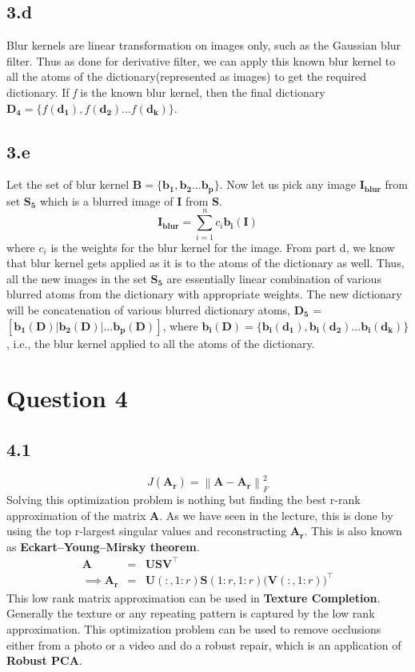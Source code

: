 \documentclass[12pt]{article}
\newcommand{\norm}[1]{\left\lVert #1 \right\rVert}
\begin{document}
\subsection*{3.d}
Blur kernels are linear transformation on images only, such as the Gaussian blur filter. Thus as done for derivative filter, we can apply this known blur kernel to all the atoms of the dictionary(represented as images) to get the required dictionary. If \textit{f} is the known blur kernel, then the final dictionary $\boldsymbol{D_4} = \{f(\boldsymbol{d_1}), f(\boldsymbol{d_2})... f(\boldsymbol{d_k})\}$.
\subsection*{3.e}
Let the set of blur kernel $\boldsymbol{B} = \{\boldsymbol{b_1}, \boldsymbol{b_2}... \boldsymbol{b_p}\}$. Now let us pick any image $\boldsymbol{I_{blur}}$ from set $\boldsymbol{S_5}$ which is a blurred image of $\boldsymbol{I}$ from $\boldsymbol{S}$.
\begin{equation*}
	\boldsymbol{I_{blur}} = \sum_{i=1}^{n}c_i\boldsymbol{b_i(I)}
\end{equation*}
where $c_i$ is the weights for the blur kernel for the image. From part d, we know that blur kernel gets applied as it is to the atoms of the dictionary as well. Thus, all the new images in the set $\boldsymbol{S_5}$ are essentially linear combination of various blurred atoms from the dictionary with appropriate weights. The new dictionary will be concatenation of various blurred dictionary atoms, $\boldsymbol{D_5}$ = $[\boldsymbol{b_1(D)}| \boldsymbol{b_2(D)}|... \boldsymbol{b_p(D)}]$, where $\boldsymbol{b_i(D)} = \{\boldsymbol{b_i(d_1)}, \boldsymbol{b_i(d_2)}... \boldsymbol{b_i(d_k)}\}$, i.e., the blur kernel applied to all the atoms of the dictionary.
\section*{Question 4}
\subsection*{4.1}
$$J(\boldsymbol{A_r}) = \norm{\boldsymbol{A} - \boldsymbol{A_r}}_F^2$$
Solving this optimization problem is nothing but finding the best r-rank approximation of the matrix $\boldsymbol{A}$.  As we have seen in the lecture, this is done by using the top r-largest singular values and reconstructing $\boldsymbol{A_r}$. This is also known as \textbf{Eckart–Young–Mirsky theorem}. 
\begin{eqnarray*}
	\boldsymbol{A} &=& \boldsymbol{U} \boldsymbol{S} \boldsymbol{V}^\intercal \\
	\implies \boldsymbol{A_r} &=& \boldsymbol{U}(:,1:r) \boldsymbol{S}(1:r,1:r)\bigg(\boldsymbol{V}(:,1:r) \bigg)^\intercal
\end{eqnarray*}
\newline
This low rank matrix approximation can be used in \textbf{Texture Completion}. Generally the texture or any repeating pattern is captured by the low rank approximation. This optimization problem can be used to remove occlusions either from a photo or a video and do a robust repair, which is an application of \textbf{Robust PCA}.
\end{document}
